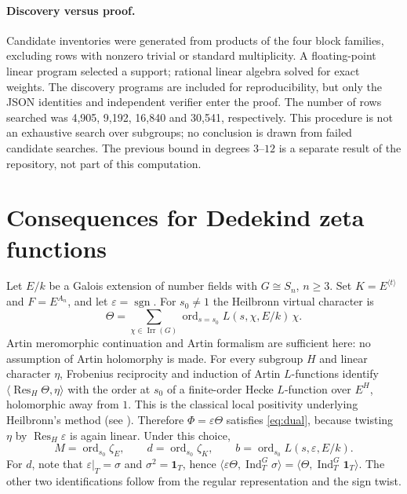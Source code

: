 \documentclass[11pt]{article}
\theoremstyle{remark}
\newcommand{\Ind}{\operatorname{Ind}}
\newcommand{\Res}{\operatorname{Res}}
\newcommand{\ord}{\operatorname{ord}}
\newcommand{\one}{\mathbf 1}
\newcommand{\sgn}{\operatorname{sgn}}
\begin{document}
\paragraph{Discovery versus proof.} Candidate inventories were generated from products of the four block families, excluding rows with nonzero trivial or standard multiplicity. A floating-point linear program selected a support; rational linear algebra solved for exact weights. The discovery programs are included for reproducibility, but only the JSON identities and independent verifier enter the proof. The number of rows searched was 4,905, 9,192, 16,840 and 30,541, respectively. This procedure is not an exhaustive search over subgroups; no conclusion is drawn from failed candidate searches. The previous bound in degrees $3$--$12$ is a separate result of the repository, not part of this computation.

\section{Consequences for Dedekind zeta functions}
Let $E/k$ be a Galois extension of number fields with $G\cong S_n$, $n\ge3$. Set $K=E^{\langle t\rangle}$ and $F=E^{A_n}$, and let $\varepsilon=\sgn$. For $s_0\ne1$ the Heilbronn virtual character is
\[
 \Theta=\sum_{\chi\in\operatorname{Irr}(G)}
 \ord_{s=s_0} L(s,\chi,E/k)\,\chi.
\]
Artin meromorphic continuation and Artin formalism are sufficient here: no assumption of Artin holomorphy is made. For every subgroup $H$ and linear character $\eta$, Frobenius reciprocity and induction of Artin $L$-functions identify $\langle\Res_H\Theta,\eta\rangle$ with the order at $s_0$ of a finite-order Hecke $L$-function over $E^H$, holomorphic away from $1$. This is the classical local positivity underlying Heilbronn's method (see \cite{nab,gun}). Therefore $\Phi=\varepsilon\Theta$ satisfies \eqref{eq:dual}, because twisting $\eta$ by $\Res_H\varepsilon$ is again linear. Under this choice,
\[
 M=\ord_{s_0}\zeta_E,\qquad d=\ord_{s_0}\zeta_K,\qquad
 b=\ord_{s_0}L(s,\varepsilon,E/k).
\]
For $d$, note that $\varepsilon|_T=\sigma$ and $\sigma^2=\one_T$, hence $\langle\varepsilon\Theta,\Ind_T^G\sigma\rangle=\langle\Theta,\Ind_T^G\one_T\rangle$. The other two identifications follow from the regular representation and the sign twist.
\end{document}
